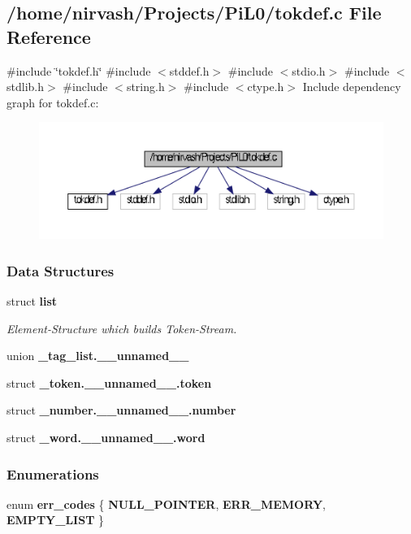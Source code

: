 \subsection{/home/nirvash/\-Projects/\-Pi\-L0/tokdef.c \-File \-Reference}
\label{tokdef_8c}
{\ttfamily \#include \char`\"{}tokdef.\-h\char`\"{}}\*
{\ttfamily \#include $<$stddef.\-h$>$}\*
{\ttfamily \#include $<$stdio.\-h$>$}\*
{\ttfamily \#include $<$stdlib.\-h$>$}\*
{\ttfamily \#include $<$string.\-h$>$}\*
{\ttfamily \#include $<$ctype.\-h$>$}\*
\-Include dependency graph for tokdef.\-c\-:\nopagebreak
\begin{figure}[H]
\begin{center}
\leavevmode
\includegraphics[width=350pt]{tokdef_8c__incl}
\end{center}
\end{figure}
\subsubsection*{\-Data \-Structures}
\begin{DoxyCompactItemize}
\item 
struct {\bf list}
\begin{DoxyCompactList}\small\item\em \-Element-\/\-Structure which builds \-Token-\/\-Stream. \end{DoxyCompactList}\item 
union {\bf \-\_\-tag\-\_\-list.\-\_\-\-\_\-unnamed\-\_\-\-\_\-}
\item 
struct {\bf \-\_\-token.\-\_\-\-\_\-unnamed\-\_\-\-\_\-.\-token}
\item 
struct {\bf \-\_\-number.\-\_\-\-\_\-unnamed\-\_\-\-\_\-.\-number}
\item 
struct {\bf \-\_\-word.\-\_\-\-\_\-unnamed\-\_\-\-\_\-.\-word}
\end{DoxyCompactItemize}
\subsubsection*{\-Enumerations}
\begin{DoxyCompactItemize}
\item 
enum {\bf err\-\_\-codes} \{ {\bf \-N\-U\-L\-L\-\_\-\-P\-O\-I\-N\-T\-E\-R}, 
{\bf \-E\-R\-R\-\_\-\-M\-E\-M\-O\-R\-Y}, 
{\bf \-E\-M\-P\-T\-Y\-\_\-\-L\-I\-S\-T}
 \}
\end{DoxyCompactItemize}

